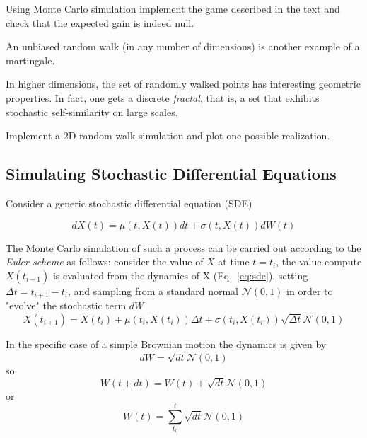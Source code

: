 \documentclass[12pt,a4paper]{article}
\begin{document}
\begin{question}
Using Monte Carlo simulation implement the game described in the text and check that the expected gain is indeed null.
\end{question}

\begin{question}
An unbiased random walk (in any number of dimensions) is another example of a martingale.

In higher dimensions, the set of randomly walked points has interesting geometric properties. In fact, one gets a discrete \emph{fractal}, that is, a set that exhibits stochastic self-similarity on large scales.

Implement a 2D random walk simulation and plot one possible realization.
\end{question}

\subsection{Simulating Stochastic Differential Equations}

Consider a generic stochastic differential equation (SDE)

\begin{equation}
dX(t) = \mu(t,X(t))dt + \sigma(t,X(t))dW(t)
\label{eq:sde}
\end{equation}

The Monte Carlo simulation of such a process can be carried out according to the \emph{Euler scheme} as follows: consider the value of $X$ at time $t=t_i$, the value compute $X(t_{i+1})$ is evaluated from the dynamics of X (Eq.~\ref{eq:sde}), setting $\Delta t = t_{i+1} - t_{i}$, and sampling from a standard normal $\mathcal{N}(0,1)$ in order to "evolve" the stochastic term $dW$
\begin{equation}
X(t_{i+1}) = X(t_i) + \mu(t_i,X(t_i))\Delta t + \sigma(t_i,X(t_i))\sqrt{\Delta t}\mathcal{N}(0,1)
\end{equation}

In the specific case of a simple Brownian motion the dynamics is given by
\begin{equation}
dW = \sqrt{dt}\mathcal{N}(0,1)
\end{equation}
so
\begin{equation}
W(t+dt) = W(t) + \sqrt{dt}\mathcal{N}(0,1)
\end{equation}
or
\begin{equation}
W(t) = \sum_{t_0}^{t} \sqrt{dt}\mathcal{N}(0,1)
\end{equation}
\end{document}
